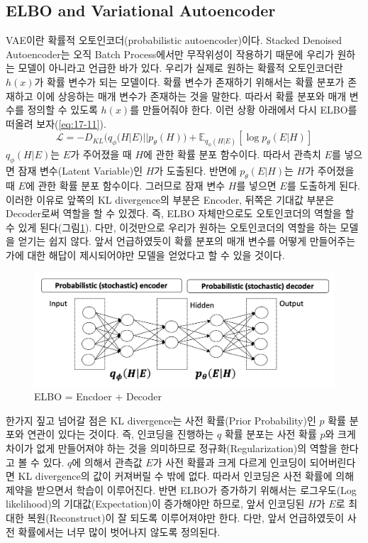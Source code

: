 \documentclass[draft=false]{oblivoir}
\begin{document}
\subsection{ELBO and Variational Autoencoder}
VAE이란  확률적 오토인코더(probabilistic autoencoder)이다. Stacked Denoised Autoencoder는 오직 Batch Process에서만 무작위성이 작용하기 때문에 우리가 원하는 모델이 아니라고 언급한 바가 있다. 우리가 실제로 원하는 확률적 오토인코더란 $h(x)$가 확률 변수가 되는 모델이다. 확률 변수가 존재하기 위해서는 확률 분포가 존재하고 이에 상응하는 매개 변수가 존재하는 것을 말한다. 따라서 확률 분포와 매개 변수를 정의할 수 있도록 $h(x)$를 만들어줘야 한다. 이런 상황 아래에서 다시 ELBO를 떠올려 보자(\ref{eq:17-11}).
\begin{equation}
	\mathcal{L} = -D_{KL}\Big(q_{\phi}(H|E)||p_{\theta}(H)\Big)
    + \mathbb{E}_{q_{\phi}(H|E)}[\log{p_{\theta}(E|H)}]
    \label{eq:17-11}
\end{equation}
$q_{\phi}(H|E)$는 $E$가 주어졌을 때 $H$에 관한 확률 분포 함수이다. 따라서 관측치 $E$를 넣으면 잠재 변수(Latent Variable)인 $H$가 도출된다. 반면에 $p_{\theta}(E|H)$는 $H$가 주어졌을 때 $E$에 관한 확률 분포 함수이다. 그러므로 잠재 변수 $H$를 넣으면 $E$를 도출하게 된다. 이러한 이유로 앞쪽의 KL divergence의 부분은 Encoder, 뒤쪽은 기대값 부분은 Decoder로써 역할을 할 수 있겠다. 즉, ELBO 자체만으로도 오토인코더의 역할을 할 수 있게 된다(그림\ref{fig:17-6}). 다만, 이것만으로 우리가 원하는 오토인코더의 역할을 하는 모델을 얻기는 쉽지 않다. 앞서 언급하였듯이 확률 분포의 매개 변수를 어떻게 만들어주는가에 대한 해답이 제시되어야만 모델을 얻었다고 할 수 있을 것이다.
\begin{figure}[ht] \centering
  \includegraphics[scale=0.5]{fig6.png}
  \caption{ELBO = Encdoer + Decoder}
  \label{fig:17-6}
\end{figure}

한가지 짚고 넘어갈 점은  KL divergence는 사전 확률(Prior Probability)인 $p$ 확률 분포와 연관이 있다는 것이다. 즉, 인코딩을 진행하는 $q$ 확률 분포는 사전 확률 $p$와 크게 차이가 없게 만들어져야 하는 것을 의미하므로 정규화(Regularization)의 역할을 한다고 볼 수 있다. $q$에 의해서 관측값 $E$가 사전 확률과 크게 다르게 인코딩이 되어버린다면  KL divergence의 값이 커져버릴 수 밖에 없다. 따라서 인코딩은 사전 확률에 의해 제약을 받으면서 학습이 이루어진다. 반면 ELBO가 증가하기 위해서는 로그우도(Log likelihood)의 기대값(Expectation)이 증가해야만 하므로, 앞서 인코딩된 $H$가 $E$로 최대한 복원(Reconstruct)이 잘 되도록 이루어져야만 한다. 다만, 앞서 언급하였듯이 사전 확률에서는 너무 많이 벗어나지 않도록 정의된다.
\end{document}
